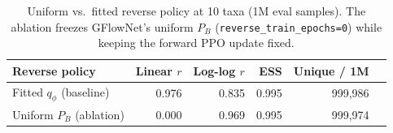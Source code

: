 \begin{table}[htbp]
\centering
\caption{Uniform vs.\ fitted reverse policy at 10 taxa (1M eval samples).
The ablation freezes GFlowNet's uniform $P_B$ (\texttt{reverse\_train\_epochs=0})
while keeping the forward PPO update fixed.}
\label{tab:uniform-ablation}
\begin{tabular}{lrrrrr}
\toprule
Reverse policy & Linear $r$ & Log-log $r$ & ESS & Unique / 1M \\
\midrule
Fitted $q_\phi$ (baseline) & 0.976 & 0.835 & 0.995 & 999{,}986 \\
Uniform $P_B$ (ablation)   & 0.000 & 0.969 & 0.995 & 999{,}974 \\
\bottomrule
\end{tabular}
\end{table}
